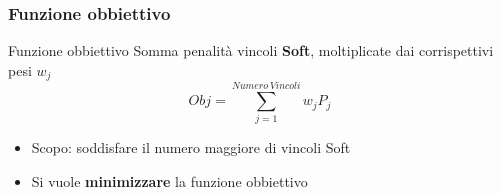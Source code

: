 \documentclass[xcolor={dvipsnames, table}]{beamer}
\newcommand\scalemath[2]{\scalebox{#1}{\mbox{\ensuremath{\displaystyle #2}}}}
\begin{document}

\begin{frame}
	\frametitle{Funzione obbiettivo}
	\begin{block}{Funzione obbiettivo}
	Somma penalità vincoli \textbf{Soft}, moltiplicate dai corrispettivi pesi $w_j$
	\begin{equation*}
	Obj = \sum_{j=1}^{Numero~Vincoli} w_j P_j
	\end{equation*}
	\end{block}
	\begin{itemize}
	\item Scopo: soddisfare il numero maggiore di vincoli Soft
	\item Si vuole \textbf{minimizzare} la funzione obbiettivo
	\end{itemize}
	
	
\end{frame}
\end{document}
